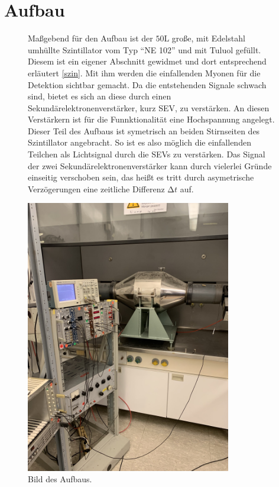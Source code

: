 
\section{Aufbau}
\begin{figure}
\begin{minipage}{0.49\textwidth}
Maßgebend für den Aufbau ist der $50 \si{\liter}$ große, mit Edelstahl umhüllte Szintillator vom Typ \enquote{NE 102} und mit Tuluol gefüllt. Diesem ist ein eigener Abschnitt gewidmet und dort entsprechend erläutert \ref{szin}. 
Mit ihm werden die einfallenden Myonen für die Detektion sichtbar gemacht. Da die entstehenden Signale schwach sind, bietet es sich an diese durch einen Sekundärelektronenverstärker, kurz SEV, zu verstärken. An diesen Verstärkern ist für
die Funnktionalität eine Hochspannung angelegt. Dieser Teil des Aufbaus ist symetrisch an beiden Stirnseiten des Szintillator angebracht. So ist es also möglich die einfallenden Teilchen als Lichtsignal durch die SEVs zu verstärken.
Das Signal der zwei Sekundärelektronenverstärker kann durch vielerlei Gründe einseitig verschoben sein, das heißt es tritt durch asymetrische Verzögerungen eine zeitliche Differenz $\increment t$ auf.
\end{minipage}%
\begin{minipage}[h]{0.49\textwidth}
    \centering
    \includegraphics[width=0.8\textwidth]{bilder/bild2.png}
    \caption{Bild des Aufbaus. 
            }
\end{minipage}
\end{figure}
